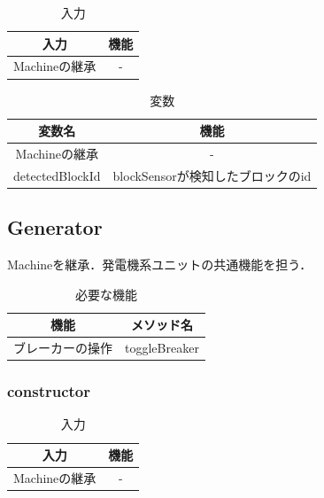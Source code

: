 \documentclass[uplatex,dvipdfmx,report]{jlreq}
\begin{document}
\begin{table}[H]
    \centering
    \caption{入力}
    \begin{tabular}{cc}
        \hline
        入力 & 機能 \\
        \hline
        \hline
        Machineの継承 & - \\
        \hline
    \end{tabular}
\end{table}

\begin{table}[H]
    \centering
    \caption{変数}
    \begin{tabular}{cc}
        \hline
        変数名 & 機能 \\
        \hline
        \hline
        Machineの継承 & - \\
        detectedBlockId & blockSensorが検知したブロックのid \\
        \hline
    \end{tabular}
\end{table}

\subsection{Generator}

Machineを継承．発電機系ユニットの共通機能を担う．

\begin{table}[H]
    \centering
    \caption{必要な機能}
    \begin{tabular}{cc}
        \hline
        機能 & メソッド名 \\
        \hline
        \hline
        ブレーカーの操作 & toggleBreaker \\
        \hline
    \end{tabular}
\end{table}

\subsubsection{constructor}

\begin{table}[H]
    \centering
    \caption{入力}
    \begin{tabular}{cc}
        \hline
        入力 & 機能 \\
        \hline
        \hline
        Machineの継承 & - \\
        \hline
    \end{tabular}
\end{table}
\end{document}
